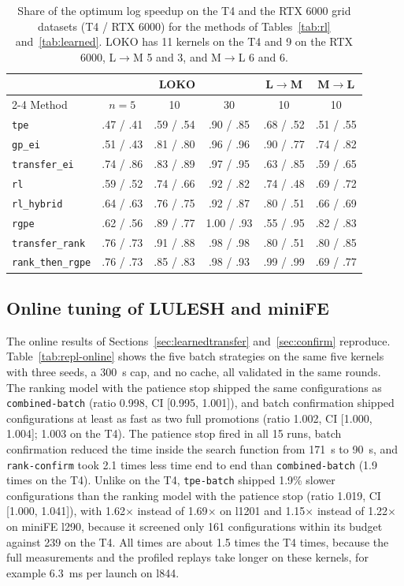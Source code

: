 \documentclass[10pt]{article}
\newcommand{\x}{\ensuremath{\times}}
\newcommand{\code}[1]{\texttt{#1}}
\begin{document}
\begin{table}[t]
\centering
\caption{Share of the optimum log speedup on the T4 and the RTX 6000 grid datasets
(T4 / RTX 6000) for the methods of Tables~\ref{tab:rl} and~\ref{tab:learned}.
LOKO has 11 kernels on the T4 and 9 on the RTX 6000, L$\to$M 5 and 3, and
M$\to$L 6 and 6.}
\label{tab:repl-rl}
\small
\setlength{\tabcolsep}{4pt}
\begin{tabular}{lccccc}
\toprule
& \multicolumn{3}{c}{LOKO} & L$\to$M & M$\to$L \\
\cmidrule(lr){2-4}
Method & $n=5$ & 10 & 30 & 10 & 10 \\
\midrule
\code{tpe} & .47 / .41 & .59 / .54 & .90 / .85 & .68 / .52 & .51 / .55 \\
\code{gp\_ei} & .51 / .43 & .81 / .80 & .96 / .96 & .90 / .77 & .74 / .82 \\
\code{transfer\_ei} & .74 / .86 & .83 / .89 & .97 / .95 & .63 / .85 & .59 / .65 \\
\code{rl} & .59 / .52 & .74 / .66 & .92 / .82 & .74 / .48 & .69 / .72 \\
\code{rl\_hybrid} & .64 / .63 & .76 / .75 & .92 / .87 & .80 / .51 & .66 / .69 \\
\code{rgpe} & .62 / .56 & .89 / .77 & 1.00 / .93 & .55 / .95 & .82 / .83 \\
\code{transfer\_rank} & .76 / .73 & .91 / .88 & .98 / .98 & .80 / .51 & .80 / .85 \\
\code{rank\_then\_rgpe} & .76 / .73 & .85 / .83 & .98 / .93 & .99 / .99 & .69 / .77 \\
\bottomrule
\end{tabular}
\end{table}

\subsection{Online tuning of LULESH and miniFE}
The online results of Sections~\ref{sec:learnedtransfer} and~\ref{sec:confirm}
reproduce. Table~\ref{tab:repl-online} shows the five batch strategies on the
same five kernels with three seeds, a 300~s cap, and no cache, all validated
in the same rounds. The ranking model with the patience stop shipped the same
configurations as \code{combined-batch} (ratio 0.998, CI [0.995, 1.001]), and
batch confirmation shipped configurations at least as fast as two full
promotions (ratio 1.002, CI [1.000, 1.004]; 1.003 on the T4). The patience
stop fired in all 15 runs, batch confirmation reduced the time inside the
search function from 171~s to 90~s, and \code{rank-confirm} took 2.1 times less
time end to end than \code{combined-batch} (1.9 times on the T4). Unlike on the
T4, \code{tpe-batch} shipped 1.9\% slower configurations than the ranking model
with the patience stop (ratio 1.019, CI [1.000, 1.041]), with 1.62\x{} instead of
1.69\x{} on l1201 and 1.15\x{} instead of 1.22\x{} on miniFE l290, because it
screened only 161 configurations within its budget against 239 on the T4. All
times are about 1.5 times the T4 times, because the full measurements and the
profiled replays take longer on these kernels, for example 6.3~ms per launch
on l844.
\end{document}
